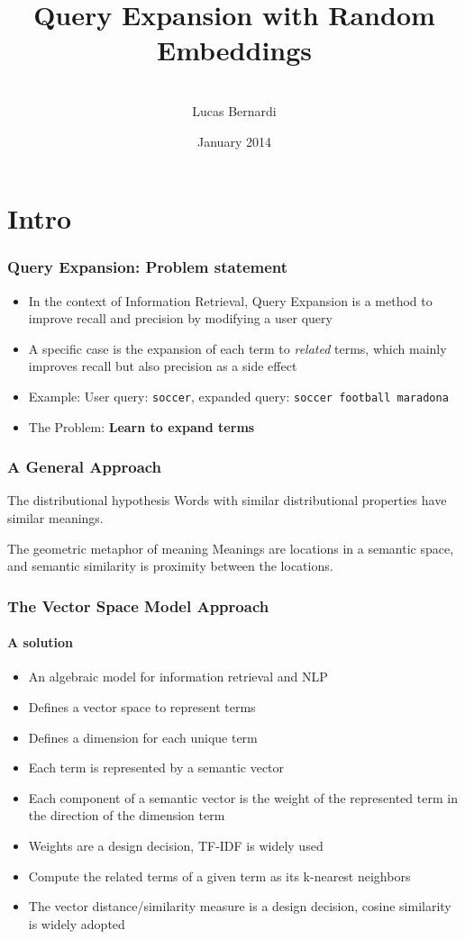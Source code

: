 \documentclass{beamer}
\title[Query Expansion with Random Embeddings]{Query Expansion with Random Embeddings}
\author[Lucas Bernardi]{\\[4mm]Lucas Bernardi}
\institute{}
\date{January 2014}
\begin{document}
\frame{\titlepage}

\frame{\tableofcontents}

\section{Intro}

\begin{frame}
	\frametitle{Query Expansion: Problem statement}
	\bigskip
	\begin{itemize}
	\item In the context of Information Retrieval, Query Expansion is a method to improve recall and precision by modifying a user query
  \item A specific case is the expansion of each term to \textit{related} terms, which mainly improves recall but also precision as a side effect
  \item Example: User query: \texttt{soccer}, expanded query: \texttt{soccer football maradona}
  \item  The Problem: \textbf{Learn to expand terms}
	\end{itemize}
\end{frame}

\begin{frame}
	\frametitle{A General Approach}
	\begin{block}{The distributional hypothesis}
    Words with similar distributional properties have similar meanings.
  \end{block}
\bigskip
	\begin{block}{The geometric metaphor of meaning}
  Meanings are locations in a semantic space, and semantic similarity is proximity between the locations.
  \end{block}
\end{frame}


\begin{frame}
	\frametitle{The Vector Space Model Approach}
	\framesubtitle{A solution}
  \begin{itemize}
    \item	An algebraic model for information retrieval and NLP
    \item	Defines a vector space to represent terms
    \item	Defines a dimension for each unique term
    \item	Each term is represented by a semantic vector
    \item Each component of a semantic vector is the weight of the represented term in the direction of the dimension term
    \item Weights are a design decision, TF-IDF is widely used
    \item Compute the related terms of a given term as its k-nearest neighbors
    \item The vector distance/similarity measure is a design decision, cosine similarity is widely adopted
  \end{itemize}
\end{frame}
\end{document}
